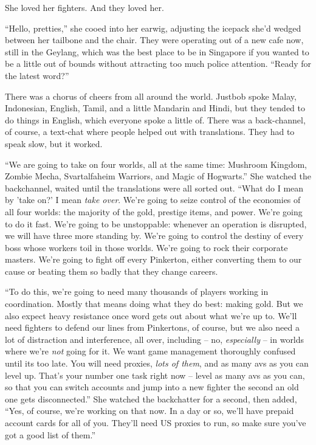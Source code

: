 She loved her fighters. And they loved her.

``Hello, pretties,'' she cooed into her earwig, adjusting the icepack
she'd wedged between her tailbone and the chair. They were
operating out of a new cafe now, still in the Geylang, which was
the best place to be in Singapore if you wanted to be a little out
of bounds without attracting too much police attention. ``Ready for
the latest word?''

There was a chorus of cheers from all around the world. Justbob
spoke Malay, Indonesian, English, Tamil, and a little Mandarin and
Hindi, but they tended to do things in English, which everyone
spoke a little of. There was a back-channel, of course, a text-chat
where people helped out with translations. They had to speak slow,
but it worked.

``We are going to take on four worlds, all at the same time:
Mushroom Kingdom, Zombie Mecha, Svartalfaheim Warriors, and Magic
of Hogwarts.'' She watched the backchannel, waited until the
translations were all sorted out. ``What do I mean by 'take on?' I
mean \emph{take over}. We're going to seize control of the
economies of all four worlds: the majority of the gold, prestige
items, and power. We're going to do it fast. We're going to be
unstoppable: whenever an operation is disrupted, we will have three
more standing by. We're going to control the destiny of every boss
whose workers toil in those worlds. We're going to rock their
corporate masters. We're going to fight off every Pinkerton, either
converting them to our cause or beating them so badly that they
change careers.

``To do this, we're going to need many thousands of players working
in coordination. Mostly that means doing what they do best: making
gold. But we also expect heavy resistance once word gets out about
what we're up to. We'll need fighters to defend our lines from
Pinkertons, of course, but we also need a lot of distraction and
interference, all over, including -- no, \emph{especially} -- in
worlds where we're \emph{not} going for it. We want game management
thoroughly confused until its too late. You will need proxies,
\emph{lots of them}, and as many avs as you can level up. That's
your number one task right now -- level as many avs as you can, so
that you can switch accounts and jump into a new fighter the second
an old one gets disconnected.'' She watched the backchatter for a
second, then added, ``Yes, of course, we're working on that now. In
a day or so, we'll have prepaid account cards for all of you.
They'll need US proxies to run, so make sure you've got a good list
of them.''

